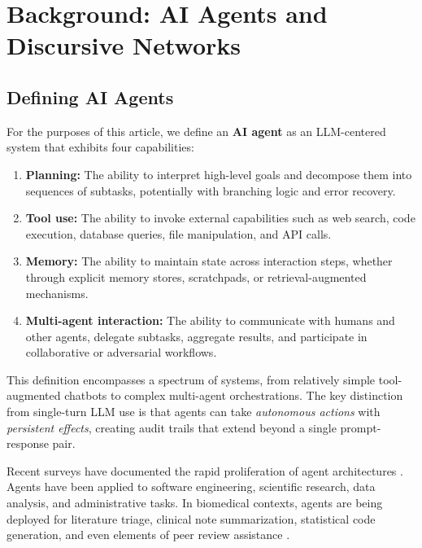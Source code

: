 \documentclass[11pt,letterpaper]{article}
\begin{document}
\section{Background: AI Agents and Discursive Networks}
\label{sec:background}

\subsection{Defining AI Agents}

For the purposes of this article, we define an \textbf{AI agent} as an LLM-centered system that exhibits four capabilities:

\begin{enumerate}[label=(\alph*)]
    \item \textbf{Planning:} The ability to interpret high-level goals and decompose them into sequences of subtasks, potentially with branching logic and error recovery.
    
    \item \textbf{Tool use:} The ability to invoke external capabilities such as web search, code execution, database queries, file manipulation, and API calls.
    
    \item \textbf{Memory:} The ability to maintain state across interaction steps, whether through explicit memory stores, scratchpads, or retrieval-augmented mechanisms.
    
    \item \textbf{Multi-agent interaction:} The ability to communicate with humans and other agents, delegate subtasks, aggregate results, and participate in collaborative or adversarial workflows.
\end{enumerate}

This definition encompasses a spectrum of systems, from relatively simple tool-augmented chatbots to complex multi-agent orchestrations. The key distinction from single-turn LLM use is that agents can take \emph{autonomous actions} with \emph{persistent effects}, creating audit trails that extend beyond a single prompt-response pair.

Recent surveys have documented the rapid proliferation of agent architectures \cite{wang2024survey,xi2023rise,guo2024large}. Agents have been applied to software engineering, scientific research, data analysis, and administrative tasks. In biomedical contexts, agents are being deployed for literature triage, clinical note summarization, statistical code generation, and even elements of peer review assistance \cite{thirunavukarasu2023}.
\end{document}
